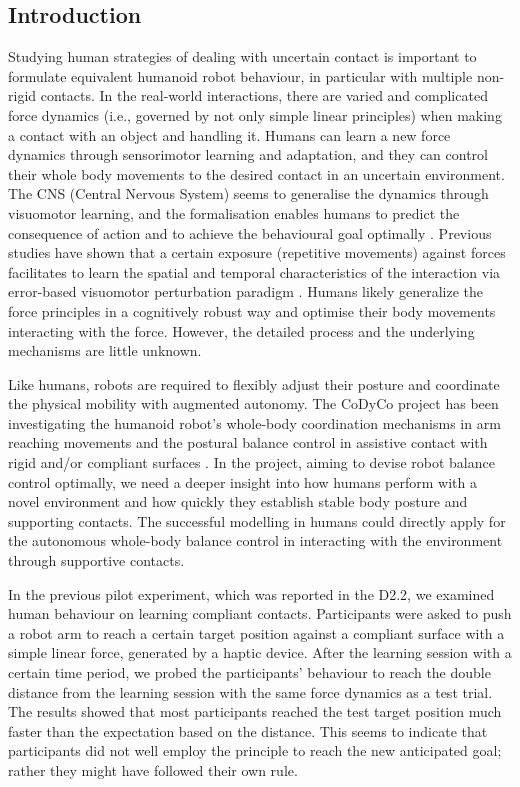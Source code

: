 
\subsection{Introduction}

Studying human strategies of dealing with uncertain contact is important to formulate equivalent humanoid robot behaviour, in particular with multiple non-rigid contacts. In the real-world interactions, there are varied and complicated force dynamics (i.e., governed by not only simple linear principles) when making a contact with an object and handling it. Humans can learn a new force dynamics through sensorimotor learning and adaptation, and they can control their whole body movements to the desired contact in an uncertain environment. The CNS (Central Nervous System) seems to generalise the dynamics through visuomotor learning, and the formalisation enables humans to predict the consequence of action and to achieve the behavioural goal optimally \cite{Wolpert2011, Davidson2003}. Previous studies have shown that a certain exposure (repetitive movements) against forces facilitates to learn the spatial and temporal characteristics of the interaction via error-based visuomotor perturbation paradigm \cite{Goodbody1998, Krakauer2006}. Humans likely generalize the force principles in a cognitively robust way and optimise their body movements interacting with the force. However, the detailed process and the underlying mechanisms are little unknown.

Like humans, robots are required to flexibly adjust their posture and coordinate the physical mobility with augmented autonomy. The CoDyCo project has been investigating the humanoid robot’s whole-body coordination mechanisms in arm reaching movements and the postural balance control in assistive contact with rigid and/or compliant surfaces \cite{Azad2015}. In the project, aiming to devise robot balance control optimally, we need a deeper insight into how humans perform with a novel environment and how quickly they establish stable body posture and supporting contacts. The successful modelling in humans could directly apply for the autonomous whole-body balance control in interacting with the environment through supportive contacts.

In the previous pilot experiment, which was reported in the D2.2, we examined human behaviour on learning compliant contacts. Participants were asked to push a robot arm to reach a certain target position against a compliant surface with a simple linear force, generated by a haptic device. After the learning session with a certain time period, we probed the participants’ behaviour to reach the double distance from the learning session with the same force dynamics as a test trial. The results showed that most participants reached the test target position much faster than the expectation based on the distance. This seems to indicate that participants did not well employ the principle to reach the new anticipated goal; rather they might have followed their own rule.

